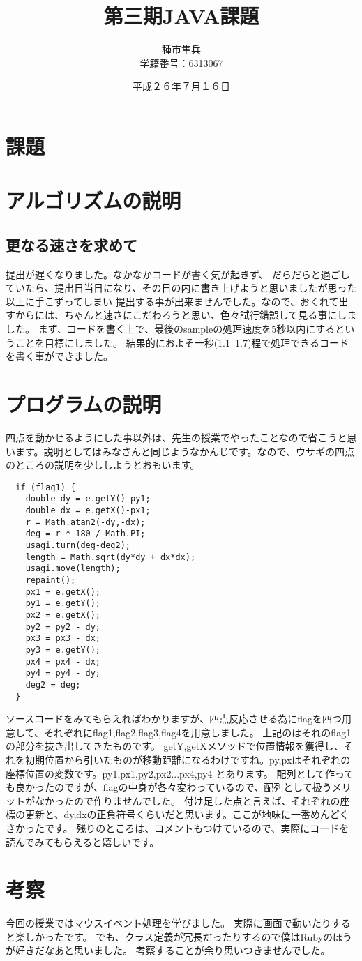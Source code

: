 \documentclass[titlepage]{jarticle}
\title{第三期JAVA課題}
\author{種市隼兵\\学籍番号：6313067}
\date{平成２６年７月１６日}
\begin{document}
\maketitle

\section{課題}

\section{アルゴリズムの説明}
\subsection{更なる速さを求めて}
提出が遅くなりました。なかなかコードが書く気が起きず、
だらだらと過ごしていたら、提出日当日になり、その日の内に書き上げようと思いましたが思った以上に手こずってしまい
提出する事が出来ませんでした。なので、おくれて出すからには、ちゃんと速さにこだわろうと思い、色々試行錯誤して見る事にしました。
まず、コードを書く上で、最後のsampleの処理速度を5秒以内にするということを目標にしました。
結果的におよそ一秒(1.1~1.7)程で処理できるコードを書く事ができました。


\section{プログラムの説明}
四点を動かせるようにした事以外は、先生の授業でやったことなので省こうと思います。説明としてはみなさんと同じようなかんじです。なので、ウサギの四点のところの説明を少ししようとおもいます。
\begin{verbatim}
  if (flag1) {
    double dy = e.getY()-py1;
    double dx = e.getX()-px1;
    r = Math.atan2(-dy,-dx);
    deg = r * 180 / Math.PI;
    usagi.turn(deg-deg2);
    length = Math.sqrt(dy*dy + dx*dx);
    usagi.move(length);
    repaint();
    px1 = e.getX();
    py1 = e.getY();
    px2 = e.getX();
    py2 = py2 - dy;
    px3 = px3 - dx;
    py3 = e.getY();
    px4 = px4 - dx;
    py4 = py4 - dy;
    deg2 = deg;
  }
\end{verbatim}
ソースコードをみてもらえればわかりますが、四点反応させる為にflagを四つ用意して、それぞれにflag1,flag2,flag3,flag4を用意しました。
上記のはそれのflag1の部分を抜き出してきたものです。
getY,getXメソッドで位置情報を獲得し、それを初期位置から引いたものが移動距離になるわけですね。py,pxはそれぞれの座標位置の変数です。py1,px1,py2,px2...px4,py4
とあります。
配列として作っても良かったのですが、flagの中身が各々変わっているので、配列として扱うメリットがなかったので作りませんでした。
付け足した点と言えば、それぞれの座標の更新と、dy,dxの正負符号くらいだと思います。ここが地味に一番めんどくさかったです。
残りのところは、コメントもつけているので、実際にコードを読んでみてもらえると嬉しいです。

\section{考察}
今回の授業ではマウスイベント処理を学びました。
実際に画面で動いたりすると楽しかったです。
でも、クラス定義が冗長だったりするので僕はRubyのほうが好きだなあと思いました。
考察することが余り思いつきませんでした。
\end{document}
